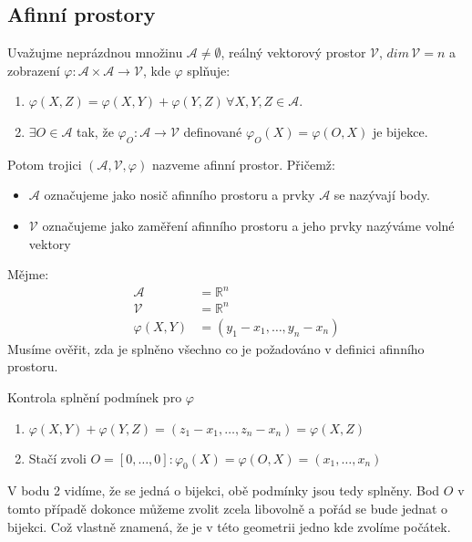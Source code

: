 \subsection{Afinní prostory}
\begin{definition}
    Uvažujme neprázdnou množinu $\mathcal{A} \neq \emptyset$, 
    reálný vektorový prostor $\mathcal{V}$, $dim\,\mathcal{V} = n$ a zobrazení $\varphi: \mathcal{A} 
    \times \mathcal{A} \rightarrow \mathcal{V}$, kde $\varphi$ splňuje:
    \begin{enumerate}[]
        \item $\varphi(X, Z) = \varphi(X, Y) + \varphi(Y, Z)\,\forall X, Y, Z \in \mathcal{A}$. 
        \item $\exists O \in \mathcal{A}$ tak, že 
        $\varphi_{O}: \mathcal{A} \rightarrow \mathcal{V}$ definované $\varphi_O(X) = \varphi(O, X)$
        je bijekce. %
    \end{enumerate}

    Potom trojici $(\mathcal{A}, \mathcal{V}, \varphi)$ nazveme afinní prostor.
    Přičemž:
    \begin{itemize}
        \item $\mathcal{A}$ označujeme jako nosič afinního prostoru a prvky $\mathcal{A}$ se
        nazývají body.
        \item $\mathcal{V}$ označujeme jako zaměření afinního prostoru a jeho prvky nazýváme
            volné vektory
    \end{itemize}
\end{definition}

\begin{example}
    Mějme:
    \begin{align*}
        \mathcal{A} &= \mathbb{R}^n\\
        \mathcal{V} &= \mathbb{R}^n\\
        \varphi(X, Y) &= (y_1 - x_1, \ldots, y_n - x_n)
    \end{align*}
    Musíme ověřit, zda je splněno všechno co je požadováno v definici afinního prostoru.

    Kontrola splnění podmínek pro $\varphi$
    \begin{enumerate}
        \item $\varphi(X, Y) + \varphi(Y, Z) = (z_1 - x_1, \ldots, z_n - x_n) = \varphi(X, Z)$
        \item Stačí zvoli $O = [0, \ldots, 0]: \varphi_0(X) = \varphi(O, X) = (x_1, \ldots, x_n)$
    \end{enumerate}
    V bodu 2 vidíme, že se jedná o bijekci, obě podmínky jsou tedy splněny. Bod $O$ v tomto případě dokonce
    můžeme zvolit zcela libovolně a pořád se bude jednat o bijekci. Což vlastně znamená, že je v této
    geometrii jedno kde zvolíme počátek.
\end{example}

